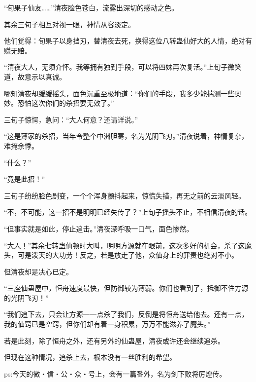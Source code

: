 \begin{this_body}
“旬果子仙友……”清夜脸色苍白，流露出深切的感动之色。

其余三旬子相互对视一眼，神情从容淡定。

他们觉得：旬果子以身挡刃，替清夜去死，换得这位八转蛊仙好大的人情，绝对有赚无赔。

“清夜大人，无须介怀。我等拥有独到手段，可以将四妹再次复活。”上旬子微笑道，故意示以真诚。

哪知清夜却缓缓摇头，面色沉重至极地道：“你们的手段，我多少能揣测一些奥妙。恐怕这次你们的杀招要无效了。”

三旬子惊愕，急问：“大人何意？还请详说。”

“这是薄家的杀招，当年令整个中洲胆寒，名为光阴飞刃。”清夜说着，神情复杂，难掩余悸。

“什么？”

“竟是此招！”

三旬子纷纷脸色剧变，一个个浑身颤抖起来，惊慌失措，再无之前的云淡风轻。

“不，不可能，这一招不是明明已经失传了？”上旬子摇头不止，不相信清夜的话。

“但事实就是如此，停止追击。”清夜深呼吸一口气，面色惨然。

“大人！”其余七转蛊仙顿时大叫，明明方源就在眼前，这次多好的机会，杀了这魔头，可是泼天的大功劳！反之，若是放走了他，众仙身上的罪责也绝对不小。

但清夜却是决心已定。

“三座仙蛊屋中，恒舟速度最快，但防御较为薄弱。你们也看到了，抵御不住方源的光阴飞刃！”

“我们追下去，只会让方源一一点杀了我们，反倒是将恒舟送给他去。还有一点，我的仙窍已是空窍，但你们却有着一身积累，万万不能滋养了魔头。”

若是此刻，除了恒舟之外，还有另外的仙蛊屋，清夜或许还会继续追杀。

但现在这种情况，追杀上去，根本没有一丝胜利的希望。

ps:今天的微・信・公・众・号上，会有一篇番外，名为剑下败将厉煌传。

\end{this_body}

